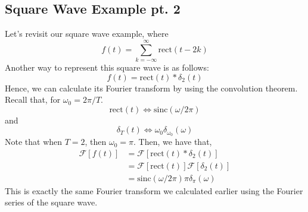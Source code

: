 \documentclass[10pt]{article}
\newcommand{\sinc}{\text{sinc}}
\newcommand{\rect}{\text{rect}}
\newcommand{\llra}{\Longleftrightarrow}
\newcommand{\fourier}{\mathcal{F}}
\begin{document}
\subsection*{Square Wave Example pt. 2}
Let's revisit our square wave example, where
\[f(t) = \sum_{k=-\infty}^\infty \rect(t-2k)\]
Another way to represent this square wave is as follows:
\[f(t) = \rect(t) * \delta_2(t)\]
Hence, we can calculate its Fourier transform by using the convolution theorem.  Recall that, for $\omega_0 = 2\pi/T$.
\[\rect(t) \llra \sinc(\omega/2\pi)\]
and
\[\delta_T(t) \llra \omega_0 \delta_{\omega_0} (\omega)\]
Note that when $T = 2$, then $\omega_0 = \pi$.  Then, we have that,
\begin{align*}
    \fourier[f(t)] &= \fourier[\rect(t) * \delta_2(t)]\\
    &= \fourier[\rect(t)] \fourier[\delta_2(t)]\\
    &= \sinc(\omega/2\pi) \pi \delta_\pi(\omega)
\end{align*}
This is exactly the same Fourier transform we calculated earlier using the Fourier series of the square wave.
\end{document}
